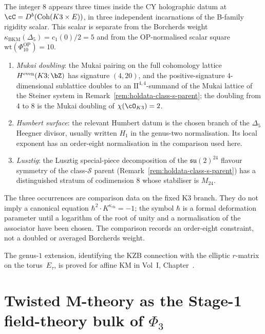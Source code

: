 \begin{remark}
\label{rem:holdata-three-faces-of-eight}
The integer $8$ appears three times inside the CY holographic datum at
$\cC = D^b(\mathrm{Coh}(K3 \times E))$, in three independent
incarnations of the B-family rigidity scalar. This scalar is separate
from the Borcherds weight
$\kappa_{\mathrm{BKM}}(\Delta_5)=c_1(0)/2=5$ and from the
OP-normalised scalar square $\mathrm{wt}(\Phi_{10}^{\mathrm{OP}})=10$.
\begin{enumerate}[label=(\roman*)]
\item \emph{Mukai doubling}: the Mukai pairing on the full cohomology
lattice $H^{\mathrm{even}}(K3; \bZ)$ has signature $(4, 20)$, and the
positive-signature $4$-dimensional sublattice doubles to an
$\mathrm{I\!I}^{4,4}$-summand of the Mukai lattice of the Steiner
system in Remark~\ref{rem:holdata-class-s-parent}; the
doubling from $4$ to $8$ is the Mukai doubling of
$\chi(\cO_{K3}) = 2$.
\item \emph{Humbert surface}: the relevant Humbert datum is the chosen
branch of the \(\Delta_5\) Heegner divisor, usually written \(H_1\) in
the genus-two normalisation. Its local exponent has an order-eight
normalisation in the comparison used here.
\item \emph{Lusztig}: the Lusztig special-piece decomposition of the
$\mathfrak{su}(2)^{24}$ flavour symmetry of the class-$\mathcal{S}$
parent (Remark~\ref{rem:holdata-class-s-parent}) has a distinguished
stratum of codimension $8$ whose stabiliser is $M_{24}$.
\end{enumerate}
The three occurrences are comparison data on the fixed K3 branch. They
do not imply a canonical equation \(\hbar^2\cdot
K^{\kappa_{\mathrm{ch}}}=-1\); the symbol \(\hbar\) is a formal
deformation parameter until a logarithm of the root of unity and a
normalisation of the associator have been chosen. The comparison
records an order-eight constraint, not a doubled or averaged
Borcherds weight.
\end{remark}

The genus-$1$ extension, identifying the KZB connection with the
elliptic $r$-matrix on the torus~$E_\tau$, is proved for affine KM
in Vol~I, Chapter~\cite{VolI}.


\section{Twisted M-theory as the Stage-1 field-theory bulk of \texorpdfstring{$\Phi_3$}{Phi-3}}
\label{sec:twisted-m-theory-phi3-bulk-boundary}

